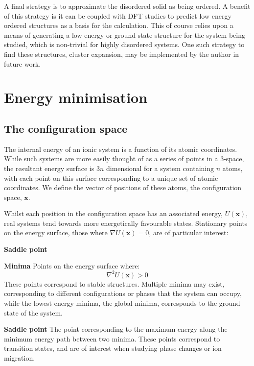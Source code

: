 A final strategy is to approximate the disordered solid as being ordered.
A benefit of this strategy is it can be coupled with DFT studies to predict low energy ordered structures as a basis for the calculation.
This of course relies upon a means of generating a low energy or ground state structure for the system being studied, which is non-trivial for highly disordered systems.
One such strategy to find these structures, cluster expansion,\cite{Chang2019} may be implemented by the author in future work.


\section{Energy minimisation}
\label{sec:minimization}
\subsection{The configuration space}
\label{sec:config}
The internal energy of an ionic system is a function of its atomic coordinates.
While such systems are more easily thought of as a series of points in a 3-space, the resultant energy surface is $3n$ dimensional for a system containing $n$ atoms, with each point on this surface corresponding to a unique set of atomic coordinates.
We define the vector of positions of these atoms, the configuration space, $\mathbf{x}$.

Whilst each position in the configuration space has an associated energy, $U(\mathbf{x})$, real systems tend towards more energetically favourable states.
Stationary points on the energy surface, those where $\nabla U(\mathbf{x}) = 0$, are of particular interest:
\begin{labeling}{\textbf{Saddle point}}
	\item [\textbf{Minima}] Points on the energy surface where:
	\begin{equation}
	\nabla^2 U(\mathbf{x}) > 0
	\end{equation}
	\noindent
	These points correspond to stable structures.
	Multiple minima may exist, corresponding to different configurations or phases that the system can occupy, while the lowest energy minima, the global minima, corresponds to the ground state of the system.
	\item [\textbf{Saddle point}] The point corresponding to the maximum energy along the minimum energy path between two minima.
	These points correspond to transition states, and are of interest when studying phase changes or ion migration.
\end{labeling}

